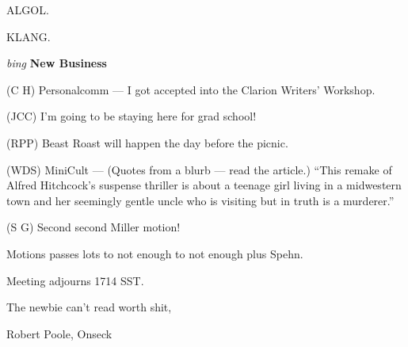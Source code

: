 ALGOL.

KLANG.

\vspace{0.15in}
{\em bing\/} {\bf New Business\/}

(C H) Personalcomm --- I got accepted into the Clarion Writers' Workshop.

(JCC) I'm going to be staying here for grad school!

(RPP) Beast Roast will happen the day before the picnic.

(WDS) MiniCult --- (Quotes from a blurb --- read the article.)  ``This remake
of Alfred Hitchcock's suspense thriller is about a teenage girl living in a
midwestern town and her seemingly gentle uncle who is visiting but in truth is
a murderer.''

(S G) Second second Miller motion!

Motions passes lots to not enough to not enough plus Spehn.

Meeting adjourns 1714 SST.

\vspace{0.15in}
\begin{center}
The newbie can't read worth shit,

Robert Poole, Onseck
\end{center}

